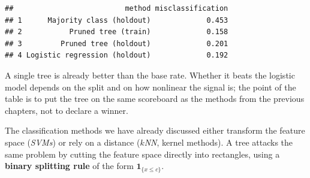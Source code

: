 \documentclass[
]{book}
\newenvironment{Shaded}{\begin{snugshade}}{\end{snugshade}}
\newcommand{\AttributeTok}[1]{\textcolor[rgb]{0.13,0.29,0.53}{#1}}
\newcommand{\DecValTok}[1]{\textcolor[rgb]{0.00,0.00,0.81}{#1}}
\newcommand{\FloatTok}[1]{\textcolor[rgb]{0.00,0.00,0.81}{#1}}
\newcommand{\FunctionTok}[1]{\textcolor[rgb]{0.13,0.29,0.53}{\textbf{#1}}}
\newcommand{\NormalTok}[1]{#1}
\newcommand{\OtherTok}[1]{\textcolor[rgb]{0.56,0.35,0.01}{#1}}
\newcommand{\SpecialCharTok}[1]{\textcolor[rgb]{0.81,0.36,0.00}{\textbf{#1}}}
\newcommand{\StringTok}[1]{\textcolor[rgb]{0.31,0.60,0.02}{#1}}
\begin{document}
\begin{Shaded}
\end{Shaded}

\begin{verbatim}
##                          method misclassification
## 1      Majority class (holdout)             0.453
## 2           Pruned tree (train)             0.158
## 3         Pruned tree (holdout)             0.201
## 4 Logistic regression (holdout)             0.192
\end{verbatim}

A single tree is already better than the base rate. Whether it beats the logistic model depends on the split and on how nonlinear the signal is; the point of the table is to put the tree on the same scoreboard as the methods from the previous chapters, not to declare a winner.

\vspace{0.6em}

The classification methods we have already discussed either transform the feature space (\emph{SVMs}) or rely on a distance (\emph{\(k\)NN}, kernel methods). A tree attacks the same problem by cutting the feature space directly into rectangles, using a \textbf{binary splitting rule} of the form \(\mathbf{1}_{\{x \leq c\}}\).
\end{document}
